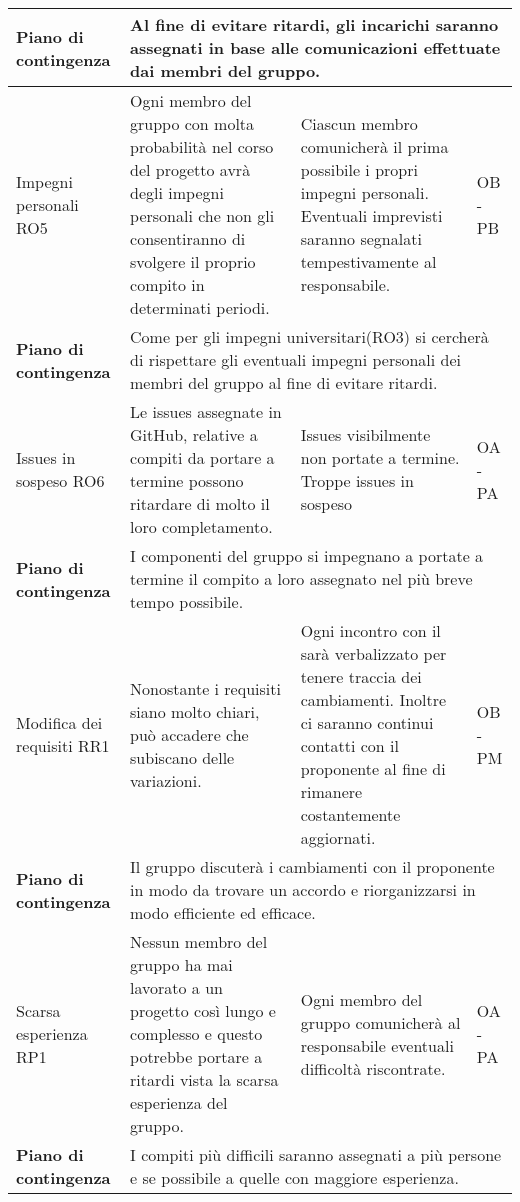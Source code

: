 \begin{center}
\begin{longtable}{|p{}|p{}|p{}|p{}|}
		\hline 
		\centering \textbf{Piano di contingenza} & \multicolumn{3}{p{0.84\textwidth}}{Al fine di evitare ritardi, gli incarichi saranno assegnati in base alle comunicazioni effettuate dai membri del gruppo.} \\
		\hline
		\centering Impegni personali RO5& Ogni membro del gruppo con molta probabilità nel corso del progetto avrà degli impegni personali che non gli consentiranno di svolgere il proprio compito in determinati periodi. & Ciascun membro comunicherà il prima possibile i propri impegni personali. Eventuali imprevisti saranno segnalati tempestivamente al responsabile. & OB - PB \\
		\hline
		\centering \textbf{Piano di contingenza} & \multicolumn{3}{p{0.84\textwidth}}{Come per gli impegni universitari(RO3) si cercherà di rispettare gli eventuali impegni personali dei membri del gruppo al fine di evitare ritardi.} \\
		\hline
		\centering Issues in sospeso RO6& Le issues assegnate in GitHub, relative a compiti da portare a termine possono ritardare di molto il loro completamento. & Issues visibilmente non portate a termine. Troppe issues in sospeso & OA - PA \\
		\hline
		\centering \textbf{Piano di contingenza} & \multicolumn{3}{p{0.84\textwidth}}{I componenti del gruppo si impegnano a portate a termine il compito a loro assegnato nel più breve tempo possibile.} \\
		\hline
		\centering Modifica dei requisiti RR1& Nonostante i requisiti siano molto chiari, può accadere che subiscano delle variazioni.  & Ogni incontro con il \glock{proponente} sarà verbalizzato per tenere traccia dei cambiamenti. Inoltre ci saranno continui contatti con il proponente al fine di rimanere costantemente aggiornati. & OB - PM \\
		\hline
		\centering \textbf{Piano di contingenza} & \multicolumn{3}{p{0.84\textwidth}}{Il gruppo discuterà i cambiamenti con il proponente in modo da trovare un accordo e riorganizzarsi in modo efficiente ed efficace.} \\
		\hline
		\centering Scarsa esperienza RP1& Nessun membro del gruppo ha mai lavorato a un progetto così lungo e complesso e questo potrebbe portare a ritardi vista la scarsa esperienza del gruppo. & Ogni membro del gruppo comunicherà al responsabile eventuali difficoltà riscontrate. & OA - PA \\
		\hline
		\centering \textbf{Piano di contingenza} & \multicolumn{3}{p{0.84\textwidth}}{I compiti più difficili saranno assegnati a più persone e se possibile a quelle con maggiore esperienza.} \\

\end{longtable}
\end{center}
